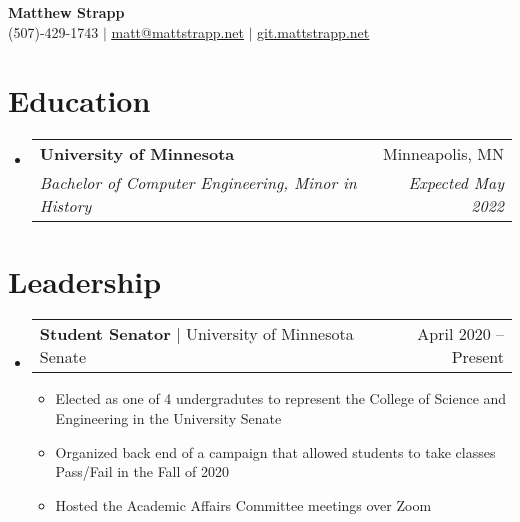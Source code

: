 \documentclass[letterpaper,11pt]{article}
\makeatletter
\newcommand{\resumeItem}[1]{
  \item\small{
    {#1 \vspace{-2pt}}
  }
}
\newcommand{\resumeSubheading}[4]{
  \vspace{-2pt}\item
    \begin{tabular*}{0.97\textwidth}[t]{l@{\extracolsep{\fill}}r}
      \textbf{#1} & #2 \\
      \textit{\small#3} & \textit{\small #4} \\
    \end{tabular*}\vspace{-7pt}
}
\newcommand{\resumeSubSubheading}[2]{
    \item
    \begin{tabular*}{0.97\textwidth}{l@{\extracolsep{\fill}}r}
      \textit{\small#1} & \textit{\small #2} \\
    \end{tabular*}\vspace{-7pt}
}
\newcommand{\resumeProjectHeading}[2]{
    \item
    \begin{tabular*}{0.97\textwidth}{l@{\extracolsep{\fill}}r}
      \small#1 & #2 \\
    \end{tabular*}\vspace{-7pt}
}
\newcommand{\resumeSubItem}[1]{\resumeItem{#1}\vspace{-4pt}}
\newcommand{\resumeSubHeadingListStart}{\begin{itemize}[leftmargin=0.15in, label={}]}
\newcommand{\resumeSubHeadingListEnd}{\end{itemize}}
\newcommand{\resumeItemListStart}{\begin{itemize}}
\newcommand{\resumeItemListEnd}{\end{itemize}\vspace{-5pt}}
\makeatother
\begin{document}

\begin{center}
    \textbf{\Huge Matthew Strapp} \\ \vspace{1pt}
    \small (507)-429-1743 $|$ \href{mailto:matt@mattstrapp.net}{\underline{matt@mattstrapp.net}} $|$ 
    \href{https://git.mattstrapp.net}{\underline{git.mattstrapp.net}}
\end{center}


\section{Education}
  \resumeSubHeadingListStart
    \resumeSubheading
      {University of Minnesota}{Minneapolis, MN}
      {Bachelor of Computer Engineering, Minor in History}{Expected May 2022}
  \resumeSubHeadingListEnd

\section{Leadership}
    \resumeSubHeadingListStart
        \resumeProjectHeading 
            {\textbf{Student Senator} $|$ University of Minnesota Senate}{April 2020 -- Present}
        \resumeItemListStart
            \resumeItem{Elected as one of 4 undergradutes to represent the College of Science and Engineering in the University Senate}
            \resumeItem{Organized back end of a campaign that allowed students to take classes Pass/Fail in the Fall of 2020}
            \resumeItem{Hosted the Academic Affairs Committee meetings over Zoom}
        \resumeItemListEnd
    \resumeSubHeadingListEnd

\end{document}
